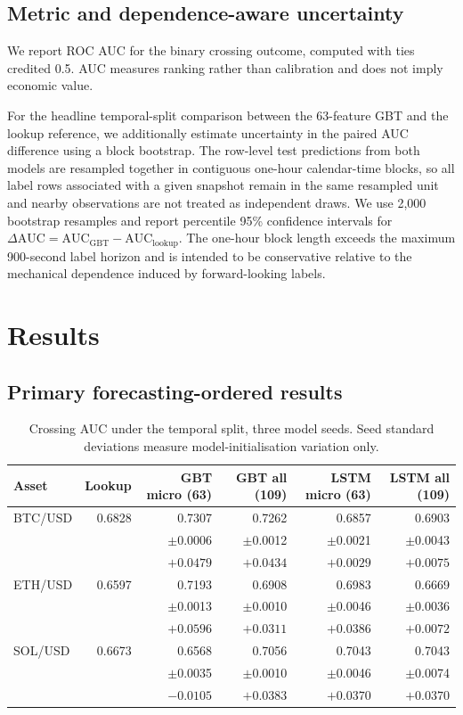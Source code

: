 \documentclass[11pt]{article}
\begin{document}
\subsection{Metric and dependence-aware uncertainty}

We report ROC AUC for the binary crossing outcome, computed with ties credited
0.5. AUC measures ranking rather than calibration and does not imply economic
value.

For the headline temporal-split comparison between the 63-feature GBT and the
lookup reference, we additionally estimate uncertainty in the paired AUC
difference using a block bootstrap. The row-level test predictions from both
models are resampled together in contiguous one-hour calendar-time blocks, so
all label rows associated with a given snapshot remain in the same resampled
unit and nearby observations are not treated as independent draws. We use 2,000
bootstrap resamples and report percentile 95\% confidence intervals for
$\Delta\mathrm{AUC}=\mathrm{AUC}_{\mathrm{GBT}}-\mathrm{AUC}_{\mathrm{lookup}}$.
The one-hour block length exceeds the maximum 900-second label horizon and is
intended to be conservative relative to the mechanical dependence induced by
forward-looking labels.

\section{Results}
\label{sec:results}

\subsection{Primary forecasting-ordered results}

\begin{table}[ht]
\centering
\caption{Crossing AUC under the temporal split, three model seeds. Seed
standard deviations measure model-initialisation variation only.}
\label{tab:main}
\small
\begin{tabular}{lrrrrr}
\toprule
Asset & Lookup & GBT micro (63) & GBT all (109) & LSTM micro (63) & LSTM all (109) \\
\midrule
BTC/USD & 0.6828 & 0.7307 & 0.7262 & 0.6857 & 0.6903 \\
& & \tiny$\pm$0.0006 & \tiny$\pm$0.0012 & \tiny$\pm$0.0021 & \tiny$\pm$0.0043 \\
& & $+0.0479$ & $+0.0434$ & $+0.0029$ & $+0.0075$ \\
\addlinespace
ETH/USD & 0.6597 & 0.7193 & 0.6908 & 0.6983 & 0.6669 \\
& & \tiny$\pm$0.0013 & \tiny$\pm$0.0010 & \tiny$\pm$0.0046 & \tiny$\pm$0.0036 \\
& & $+0.0596$ & $+0.0311$ & $+0.0386$ & $+0.0072$ \\
\addlinespace
SOL/USD & 0.6673 & 0.6568 & 0.7056 & 0.7043 & 0.7043 \\
& & \tiny$\pm$0.0035 & \tiny$\pm$0.0010 & \tiny$\pm$0.0046 & \tiny$\pm$0.0074 \\
& & $-0.0105$ & $+0.0383$ & $+0.0370$ & $+0.0370$ \\
\bottomrule
\end{tabular}
\end{table}
\end{document}
